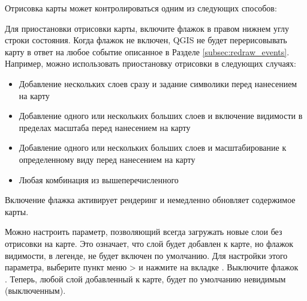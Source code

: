 Отрисовка карты может контролироваться одним из следующих способов:

\label{label_suspendrender}

Для приостановки отрисовки карты, включите флажок  в правом нижнем углу строки состояния. Когда флажок  не включен, QGIS не будет перерисовывать карту в ответ на любое событие описанное в Разделе \ref{subsec:redraw_events}. Например, можно использовать приостановку отрисовки в следующих случаях:

\begin{itemize}
\item Добавление нескольких слоев сразу и задание символики перед нанесением на карту
\item Добавление одного или нескольких больших слоев и включение видимости в пределах масштаба перед нанесением на карту
\item Добавление одного или нескольких больших слоев и масштабирование к определенному виду перед нанесением на карту
\item Любая комбинация из вышеперечисленного
\end{itemize}

Включение флажка  активирует рендеринг и немедленно обновляет содержимое карты.

\label{label_settinglayer}

Можно настроить параметр, позволяющий всегда загружать новые слои без отрисовки на карте. Это означает, что слой будет добавлен к карте, но флажок видимости, в легенде, не будет включен по умолчанию. Для настройки этого параметра, выберите пункт меню  >  и нажмите на вкладке . Выключите флажок \\. Теперь, любой слой добавленный к карте, будет по умолчанию невидимым (выключенным).

%
%


